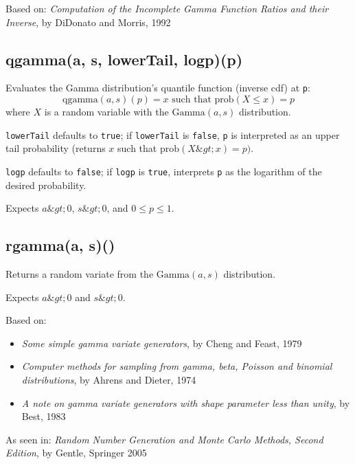 \documentclass{article}
\begin{document}
Based on: \emph{Computation of the Incomplete Gamma Function Ratios and their
Inverse}, by DiDonato and Morris, 1992


    \subsection*{qgamma(a, s, lowerTail, logp)(p)}
    Evaluates the Gamma distribution's quantile function (inverse cdf) at \texttt{p}:
$$\textrm{qgamma}(a, s)(p) = x \textrm{ such that } \textrm{prob}(X \leq x) = p$$
where $X$ is a random variable with the $\textrm{Gamma}(a, s)$ distribution.


\texttt{lowerTail} defaults to \texttt{true}; if \texttt{lowerTail} is \texttt{false}, \texttt{p} is
interpreted as an upper tail probability (returns
$x$ such that $\textrm{prob}(X \&gt; x) = p)$.


\texttt{logp} defaults to \texttt{false}; if \texttt{logp} is \texttt{true}, interprets \texttt{p} as
the logarithm of the desired probability.


Expects $a\&gt;0$, $s\&gt;0$, and $0 \leq p \leq 1$.


    \subsection*{rgamma(a, s)()}
    Returns a random variate from the $\textrm{Gamma}(a, s)$ distribution.


Expects $a \&gt; 0$ and $s \&gt; 0$.


Based on:


\begin{itemize}

\item \emph{Some simple gamma variate generators}, by Cheng and Feast, 1979

\item \emph{Computer methods for sampling from gamma, beta, Poisson and binomial
distributions}, by Ahrens and Dieter, 1974

\item \emph{A note on gamma variate generators with shape parameter less than
unity}, by Best, 1983

\end{itemize}

As seen in: \emph{Random Number Generation and Monte Carlo Methods, Second Edition},
by Gentle, Springer 2005
\end{document}
